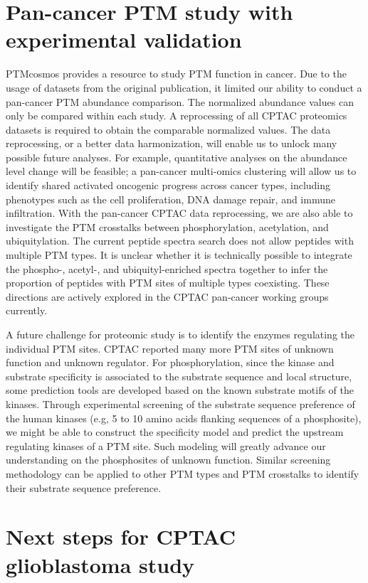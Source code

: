 

\section{Pan-cancer PTM study with experimental validation}
PTMcosmos provides a resource to study PTM function in cancer. Due to the usage of datasets from the original publication, it limited our ability to conduct a pan-cancer PTM abundance comparison. The normalized abundance values can only be compared within each study. A reprocessing of all CPTAC proteomics datasets is required to obtain the comparable normalized values. The data reprocessing, or a better data harmonization, will enable us to unlock many possible future analyses. For example, quantitative analyses on the abundance level change will be feasible; a pan-cancer multi-omics clustering will allow us to identify shared activated oncogenic progress across cancer types, including phenotypes such as the cell proliferation, DNA damage repair, and immune infiltration. With the pan-cancer CPTAC data reprocessing, we are also able to investigate the PTM crosstalks between phosphorylation, acetylation, and ubiquitylation. The current peptide spectra search does not allow peptides with multiple PTM types. It is unclear whether it is technically possible to integrate the phospho-, acetyl-, and ubiquityl-enriched spectra together to infer the proportion of peptides with PTM sites of multiple types coexisting. These directions are actively explored in the CPTAC pan-cancer working groups currently.

A future challenge for proteomic study is to identify the enzymes regulating the individual PTM sites. CPTAC reported many more PTM sites of unknown function and unknown regulator. For phosphorylation, since the kinase and substrate specificity is associated to the substrate sequence and local structure, some prediction tools are developed based on the known substrate motifs of the kinases. Through experimental screening of the substrate sequence preference of the human kinases (e.g, 5 to 10 amino acids flanking sequences of a phosphosite), we might be able to construct the specificity model and predict the upstream regulating kinases of a PTM site. Such modeling will greatly advance our understanding on the phosphosites of unknown function. Similar screening methodology can be applied to other PTM types and PTM crosstalks to identify their substrate sequence preference.


\section{Next steps for CPTAC glioblastoma study}

